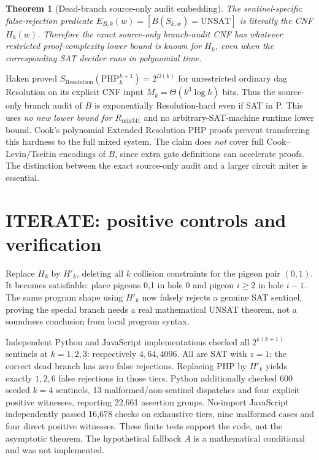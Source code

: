 \documentclass[11pt]{article}
\newtheorem{theorem}{Theorem}
\begin{document}
\begin{theorem}[Dead-branch source-only audit embedding]
The sentinel-specific false-rejection predicate \(E_{B,k}(w)=[B(S_{k,w})=\mathrm{UNSAT}]\) is \emph{literally} the CNF \(H_k(w)\). Therefore the exact source-only branch-audit CNF has whatever restricted proof-complexity lower bound is known for \(H_k\), even when the corresponding SAT decider runs in polynomial time.
\end{theorem}
\noindent Haken proved \(S_{\mathrm{Resolution}}(\mathrm{PHP}^{k+1}_k)=2^{\Omega(k)}\) for unrestricted ordinary dag Resolution on its explicit CNF input \(M_k=\Theta(k^3\log k)\) bits. Thus the source-only branch audit of \(B\) is exponentially Resolution-hard even if SAT in P. This uses \emph{no new lower bound for \(R_{\mathrm{mix341}}\)} and no arbitrary-SAT-machine runtime lower bound. Cook's polynomial Extended Resolution PHP proofs prevent transferring this hardness to the full mixed system. The claim does \emph{not} cover full Cook--Levin/Tseitin encodings of \(B\), since extra gate definitions can accelerate proofs. The distinction between the exact source-only audit and a larger circuit miter is essential.

\section*{ITERATE: positive controls and verification}
Replace \(H_k\) by \(H'_k\), deleting all \(k\) collision constraints for the pigeon pair \((0,1)\). It becomes satisfiable: place pigeons 0,1 in hole 0 and pigeon \(i\ge2\) in hole \(i-1\). The same program shape using \(H'_k\) now falsely rejects a genuine SAT sentinel, proving the special branch needs a real mathematical UNSAT theorem, not a soundness conclusion from local program syntax.

Independent Python and JavaScript implementations checked all \(2^{k(k+1)}\) sentinels at \(k=1,2,3\): respectively \(4,64,4096\). All are SAT with \(z=1\); the correct dead branch has zero false rejections. Replacing PHP by \(H'_k\) yields exactly \(1,2,6\) false rejections in those tiers. Python additionally checked 600 seeded \(k=4\) sentinels, 13 malformed/non-sentinel dispatches and four explicit positive witnesses, reporting 22,661 assertion groups. No-import JavaScript independently passed 16,678 checks on exhaustive tiers, nine malformed cases and four direct positive witnesses. These finite tests support the code, not the asymptotic theorem. The hypothetical fallback \(A\) is a mathematical conditional and was not implemented.
\end{document}
